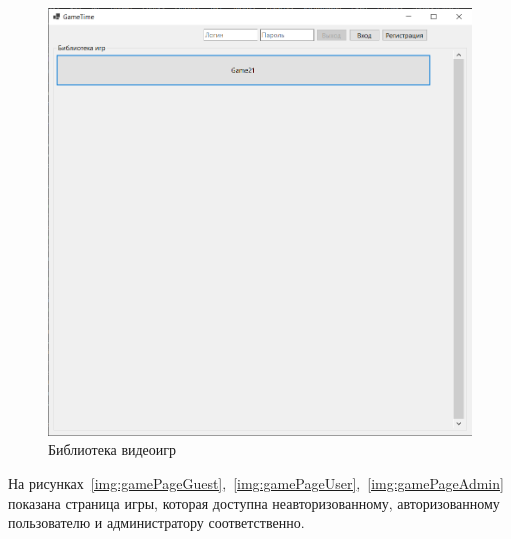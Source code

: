 \clearpage
\begin{figure}[H]
	\begin{center}
		\includegraphics[scale=0.7]{../imgs/interface/main.png}
	\end{center}
	\captionsetup{justification=centering}
	\caption{Библиотека видеоигр}
	\label{img:main}
\end{figure}

На рисунках~\ref{img:gamePageGuest},~\ref{img:gamePageUser},~\ref{img:gamePageAdmin} показана страница игры, которая доступна неавторизованному, авторизованному пользователю и администратору соответственно.

